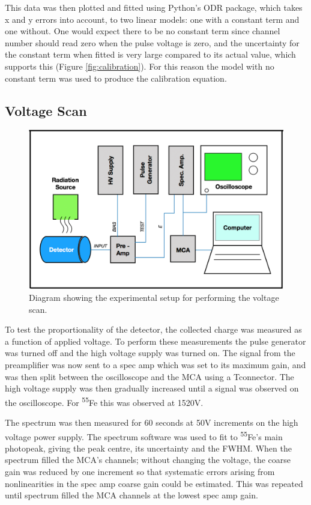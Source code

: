 This data was then plotted and fitted using Python's ODR package, which takes x and y errors into account, to two linear models: one with a constant term and one without. One would expect there to be no constant term since channel number should read zero when the pulse voltage is zero, and the uncertainty for the constant term when fitted is very large compared to its actual value, which supports this (Figure \ref{fig:calibration}). For this reason the model with no constant term was used to produce the calibration equation.

\subsection{Voltage Scan} \label{sec:mthd:voltageRun}

\begin{figure}[h]
  \centering
  \includegraphics[width=\linewidth]{scanSchematic.png}
  \caption{Diagram showing the experimental setup for performing the voltage scan.}
  \label{fig:scanSetup}
\end{figure}

To test the proportionality of the detector, the collected charge was measured as a function of applied voltage. To perform these measurements the pulse generator was turned off and the high voltage supply was turned on. The signal from the preamplifier was now sent to a spec amp which was set to its maximum gain, and was then split between the oscilloscope and the MCA using a \textquotesingle T\textquotesingle connector.
The high voltage supply was then gradually increased until a signal was observed on the oscilloscope. For \textsuperscript{55}Fe this was observed at 1520V.

The spectrum was then measured for 60 seconds at 50V increments on the high voltage power supply. The spectrum software was used to fit to \textsuperscript{55}Fe's main photopeak, giving the peak centre, its uncertainty and the FWHM. When the spectrum filled the MCA's channels; without changing the voltage, the coarse gain was reduced by one increment so that systematic errors arising from nonlinearities in the spec amp coarse gain could be estimated. This was repeated until spectrum filled the MCA channels at the lowest spec amp gain.

